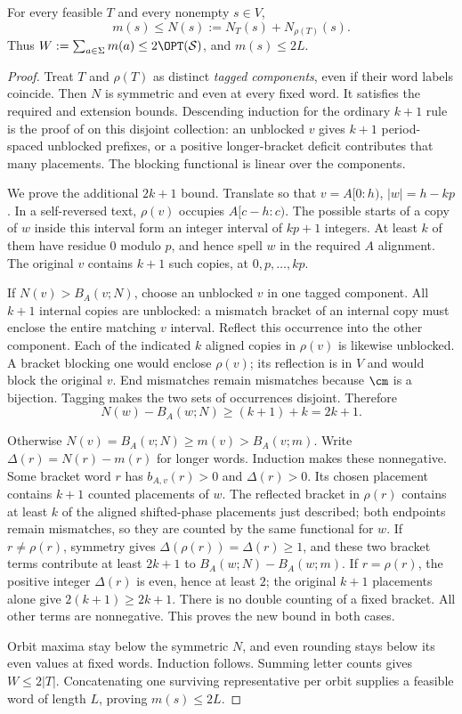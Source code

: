 \begin{lemma}\label{lem:domination}
For every feasible $T$ and every nonempty $s\in V$,
\[
m(s)\le N(s):=N_T(s)+N_{\rho(T)}(s).
\]
Thus $W:=\sum_{a\in\Sigma}m(a)\le2\OPT(\mathcal S)$, and $m(s)\le2L$.
\end{lemma}
\begin{proof}
Treat $T$ and $\rho(T)$ as distinct \emph{tagged components}, even if
their word labels coincide. Then $N$ is symmetric and even at every
fixed word. It satisfies the required and extension bounds. Descending
induction for the ordinary $k+1$ rule is the proof of
 on this disjoint collection: an unblocked
$v$ gives $k+1$ period-spaced unblocked prefixes, or a positive
longer-bracket deficit contributes that many placements. The blocking
functional is linear over the components.

We prove the additional $2k+1$ bound. Translate so that $v=A[0:h)$,
$|w|=h-kp$. In a self-reversed text, $\rho(v)$ occupies $A[c-h:c)$.
The possible starts of a copy of $w$ inside this interval form an
integer interval of $kp+1$ integers. At least $k$ of them have residue
$0$ modulo $p$, and hence spell $w$ in the required $A$ alignment.
The original $v$ contains $k+1$ such copies, at $0,p,\ldots,kp$.

If $N(v)>B_A(v;N)$, choose an unblocked $v$ in one tagged component.
All $k+1$ internal copies are unblocked: a mismatch bracket of an
internal copy must enclose the entire matching $v$ interval. Reflect
this occurrence into the other component. Each of the indicated $k$
aligned copies in $\rho(v)$ is likewise unblocked. A bracket blocking
one would enclose $\rho(v)$; its reflection is in $V$ and would block
the original $v$. End mismatches remain mismatches because $\cm$ is a
bijection. Tagging makes the two sets of occurrences disjoint. Therefore
\[
N(w)-B_A(w;N)\ge(k+1)+k=2k+1.
\]

Otherwise $N(v)=B_A(v;N)\ge m(v)>B_A(v;m)$. Write
$\Delta(r)=N(r)-m(r)$ for longer words. Induction makes these
nonnegative. Some bracket word $r$ has $b_{A,v}(r)>0$ and
$\Delta(r)>0$. Its chosen placement contains $k+1$ counted placements
of $w$. The reflected bracket in $\rho(r)$ contains at least $k$
of the aligned shifted-phase placements just described; both endpoints
remain mismatches, so they are counted by the same functional for $w$.
If $r\ne\rho(r)$, symmetry gives
$\Delta(\rho(r))=\Delta(r)\ge1$, and these two bracket terms contribute
at least $2k+1$ to $B_A(w;N)-B_A(w;m)$. If $r=\rho(r)$, the positive
integer $\Delta(r)$ is even, hence at least $2$; the original $k+1$
placements alone give $2(k+1)\ge2k+1$. There is no double counting of
a fixed bracket. All other terms are nonnegative. This proves the new
bound in both cases.

Orbit maxima stay below the symmetric $N$, and even rounding stays below
its even values at fixed words. Induction follows. Summing letter
counts gives $W\le2|T|$. Concatenating one surviving representative per
orbit supplies a feasible word of length $L$, proving $m(s)\le2L$.
\end{proof}

